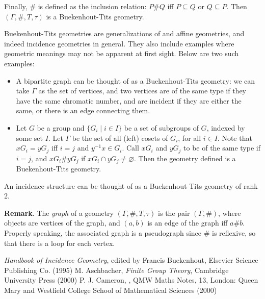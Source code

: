 \documentclass[12pt]{article}
\begin{document}
Finally, $\#$ is defined as the inclusion relation: $P\# Q$ iff $P\subseteq Q$ or $Q\subseteq P$.  Then $(\Gamma,\#,T,\tau)$ is a Buekenhout-Tits geometry.

Buekenhout-Tits geometries are generalizations of  and affine geometries, and indeed incidence geometries in general.  They also include examples where geometric meanings may not be apparent at first sight.  Below are two such examples:
\begin{itemize}
\item A bipartite graph can be thought of as a Buekenhout-Tits geometry: we can take $\Gamma$ as the set of vertices, and two vertices are of the same type if they have the same chromatic number, and are incident if they are either the same, or there is an edge connecting them.
\item Let $G$ be a group and $\lbrace G_i\mid i\in I\rbrace$ be a set of subgroups of $G$, indexed by some set $I$.  Let $\Gamma$ be the set of all (left) cosets of $G_i$, for all $i\in I$.  Note that $xG_i=yG_j$ iff $i=j$ and $y^{-1}x\in G_i$.  Call $xG_i$ and $yG_j$ to be of the same type if $i=j$, and $xG_i \# yG_j$ if $xG_i\cap yG_j\ne \varnothing$.  Then the geometry defined is a Buekenhout-Tits geometry.
\end{itemize}

An incidence structure can be thought of as a Buekenhout-Tits geometry of rank 2. 

\textbf{Remark}.  The \emph{graph} of a geometry $(\Gamma,\#,T,\tau)$ is the pair $(\Gamma,\#)$, where objects are vertices of the graph, and $(a,b)$ is an edge of the graph iff $a\#b$.  Properly speaking, the associated graph is a pseudograph since $\#$ is reflexive, so that there is a loop for each vertex.

\begin{thebibliography}{6}
 {\it Handbook of Incidence Geometry}, edited by Francis Buekenhout,
Elsevier Science Publishing Co. (1995)
 M. Aschbacher, {\it Finite Group Theory}, Cambridge University Press (2000)
 P. J. Cameron, {\it {}}, QMW Maths Notes, 13, London: Queen Mary and Westfield College School of Mathematical Sciences (2000)
\end{thebibliography}
\end{document}
